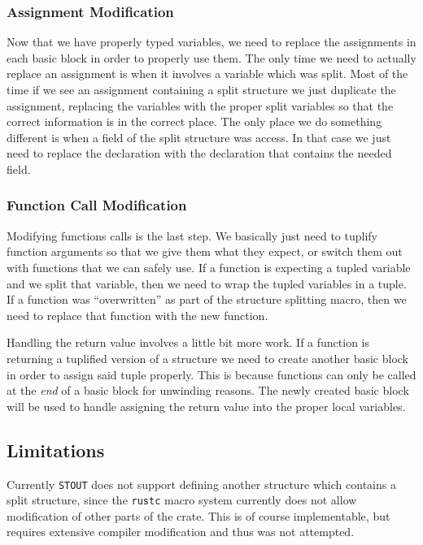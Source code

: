 \documentclass[prodmode,acmtecs]{acmsmall} %
\newcommand{\rustcname}{{\texttt{rustc}}}
\def \rustc {\rustcname{}\xspace}
\newcommand{\projectname}{{\texttt{STOUT}}}
\def \name{\projectname\xspace}
\begin{document}
\subsubsection{Assignment Modification}
\label{sec:assign}

Now that we have properly typed variables, we need to replace the assignments
in each basic block in order to properly use them. The only time we need
to actually replace an assignment is when it involves a variable which was
split.  
Most of the time if we see an assignment containing a split structure
we just duplicate the assignment, replacing the variables with the proper 
split variables so that the correct information is in the
correct place. The only place we do something different is when
a field of the split structure was access. In that case we 
just need to replace the declaration with the declaration
that contains the needed field.

\subsubsection{Function Call Modification}
\label{sec:funcall}

Modifying functions calls is the last step. We basically just 
need to tuplify function arguments so that we give them what they
expect, or switch them out with functions that we can safely use.
If a function is expecting a tupled variable and we split that
variable, then we need to wrap the tupled variables in a tuple. 
If a function was ``overwritten'' as part of the structure 
splitting macro, then we need to replace that function with
the new function. 

Handling the return value involves a little bit more work.
If a function is returning a tuplified version of
a structure we need to create another basic block in order
to assign said tuple properly. This is because 
functions can only be called at the \textit{end} of a 
basic block for unwinding reasons. The newly created 
basic block will be used to handle assigning the return value into
the proper local variables.

\subsection{Limitations}
\label{sec:limits}
Currently \name does not support defining another structure
which contains a split structure, since the \rustc macro system
currently does not allow modification of other parts of the 
crate. This is of course implementable, but requires extensive
compiler modification and thus was not attempted.
\end{document}
